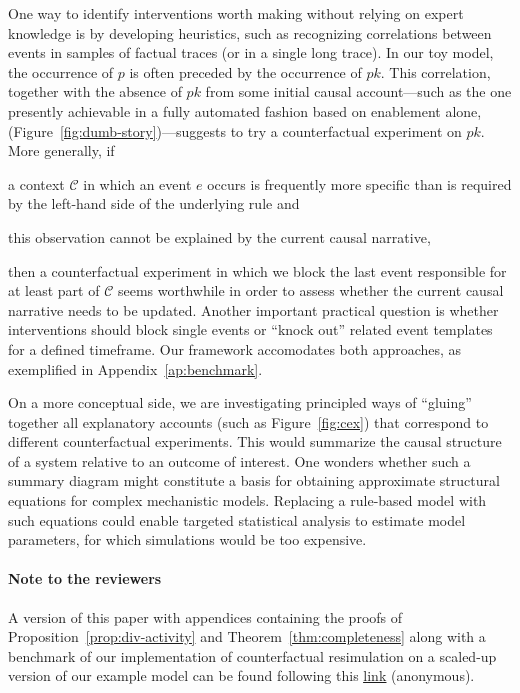 One way to identify interventions worth making without relying on
expert knowledge is by developing heuristics, such as recognizing
correlations between events in samples of factual traces (or in a
single long trace). In our toy model, the occurrence of $p$ is often
preceded by the occurrence of $pk$. This correlation, together with
the absence of $pk$ from some initial causal account---such as the one
presently achievable in a fully automated fashion based on enablement
alone, (Figure~\ref{fig:dumb-story})---suggests to try a
counterfactual experiment on $pk$. More generally,
if \begin{inparaenum}[(i)] \item a context $\mathcal C$ in which an
  event $e$ occurs is frequently more specific than is required by the
  left-hand side of the underlying rule and \item this observation
  cannot be explained by the current causal
  narrative, \end{inparaenum} then a counterfactual experiment in
which we block the last event responsible for at least part of
$\mathcal C$ seems worthwhile in order to assess whether the current
causal narrative needs to be updated.  Another important practical
question is whether interventions should block single events or
``knock out'' related event templates for a defined timeframe. Our
framework accomodates both approaches, as exemplified in
Appendix~\ref{ap:benchmark}.

On a more conceptual side, we are investigating principled ways of
``gluing'' together all explanatory accounts (such as
Figure~\ref{fig:cex}) that correspond to different counterfactual
experiments. This would summarize the causal structure of a system
relative to an outcome of interest. One wonders whether such a summary
diagram might constitute a basis for obtaining approximate structural
equations for complex mechanistic models. Replacing a rule-based model
with such equations could enable targeted statistical analysis to
estimate model parameters, for which simulations would be too
expensive.

\ifreview \ifincludeappendices \else
\paragraph{Note to the reviewers}
A version of this paper with appendices containing the proofs of
Proposition~\ref{prop:div-activity} and Theorem~\ref{thm:completeness}
along with a benchmark of our implementation of counterfactual
resimulation on a scaled-up version of our example model can be found
following this
\underline{\href{https://www.dropbox.com/sh/2fwji0its0o0ciq/AABfLZ-GO2wCE2x3h3ulUbB-a?dl=0}{link}}
(anonymous).
\fi
\fi